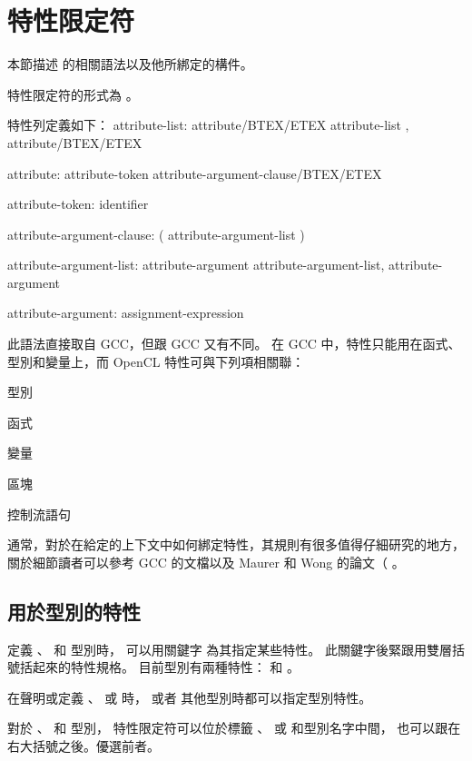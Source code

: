 \section{特性限定符}

本節描述  的相關語法以及他所綁定的構件。

特性限定符的形式為 。

特性列定義如下：
\startclc
attribute-list:
	attribute/BTEX/ETEX
	attribute-list , attribute/BTEX/ETEX

attribute:
	attribute-token attribute-argument-clause/BTEX/ETEX

attribute-token:
	identifier

attribute-argument-clause:
	( attribute-argument-list )

attribute-argument-list:
	attribute-argument
	attribute-argument-list, attribute-argument

attribute-argument:
	assignment-expression
\stopclc

此語法直接取自 GCC，但跟 GCC 又有不同。
在 GCC 中，特性只能用在函式、型別和變量上，而 OpenCL 特性可與下列項相關聯：
\startigBase
\item 型別
\item 函式
\item 變量
\item 區塊
\item 控制流語句
\stopigBase

通常，對於在給定的上下文中如何綁定特性，其規則有很多值得仔細研究的地方，
關於細節讀者可以參考 GCC 的文檔以及 Maurer 和 Wong 的論文（
。

\subsection{用於型別的特性}

定義 、  和  型別時，
可以用關鍵字  為其指定某些特性。
此關鍵字後緊跟用雙層括號括起來的特性規格。
目前型別有兩種特性：  和 。

在聲明或定義 、  或  時，
或者  其他型別時都可以指定型別特性。

對於 、  和  型別，
特性限定符可以位於標籤 、  或  和型別名字中間，
也可以跟在右大括號之後。優選前者。


